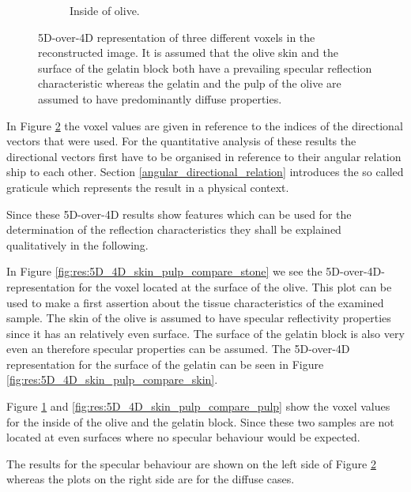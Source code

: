 \begin{figure}[H]
\begin{subfigure}[b]{0.47\textwidth}
         \caption{Inside of olive. }
         \label{fig:res:5D_4D_skin_pulp_compare_insideOlive}
     \end{subfigure}
        \caption{ 5D-over-4D representation of three different voxels in the reconstructed image. It is assumed that the olive skin and the surface of the gelatin block both have a prevailing specular reflection characteristic whereas the gelatin and the pulp of the olive are assumed to have predominantly diffuse properties. }
        \label{fig:res:5D_4D_skin_pulp_compare}
\end{figure}


 
In Figure \ref{fig:res:5D_4D_skin_pulp_compare} the voxel values are given in reference to the indices of the directional vectors that were used. For the quantitative analysis of these results the directional vectors first have to be organised in reference to their angular relation ship to each other. Section \ref{angular_directional_relation} introduces the so called graticule which represents the result in a physical context.

Since these 5D-over-4D results show features which can be used for the determination of the reflection characteristics they shall be explained qualitatively in the following.  


\medskip



In Figure \ref{fig:res:5D_4D_skin_pulp_compare_stone} we see the 5D-over-4D-representation for the voxel located at the surface of the olive. This plot can be used to make a first assertion about the tissue characteristics of the examined sample. The skin of the olive is assumed to have specular reflectivity properties since it has an relatively even surface. The surface of the gelatin block is also very even an therefore specular properties can be assumed. The 5D-over-4D representation for the surface of the gelatin can be seen in Figure \ref{fig:res:5D_4D_skin_pulp_compare_skin}.

Figure \ref{fig:res:5D_4D_skin_pulp_compare_insideOlive} and \ref{fig:res:5D_4D_skin_pulp_compare_pulp} show the voxel values for the inside of the olive and the gelatin block. Since these two samples are not located at even surfaces where no specular behaviour would be expected. 

The results for the specular behaviour are shown on the left side of Figure \ref{fig:res:5D_4D_skin_pulp_compare} whereas the plots on the right side are for the diffuse cases.


